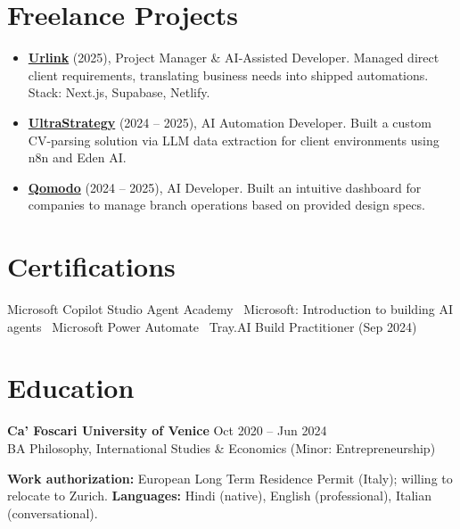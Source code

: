 \documentclass[a4paper,10pt]{article}
\begin{document}
\section{Freelance Projects}
\begin{itemize}
 \item \textbf{\href{https://smarturlink.com/}{Urlink}} (2025), Project Manager \& AI-Assisted Developer. Managed direct client requirements, translating business needs into shipped automations. Stack: Next.js, Supabase, Netlify.
 \item \textbf{\href{https://ultrastrategy.com}{UltraStrategy}} (2024 -- 2025), AI Automation Developer. Built a custom CV-parsing solution via LLM data extraction for client environments using n8n and Eden AI.
 \item \textbf{\href{https://www.qomodo.me/}{Qomodo}} (2024 -- 2025), AI Developer. Built an intuitive dashboard for companies to manage branch operations based on provided design specs.
\end{itemize}

\section{Certifications}
Microsoft Copilot Studio Agent Academy \textbullet\ Microsoft: Introduction to building AI agents \textbullet\ Microsoft Power Automate \textbullet\ Tray.AI Build Practitioner (Sep 2024)

\section{Education}
\textbf{Ca' Foscari University of Venice} \hfill Oct 2020 -- Jun 2024\\
BA Philosophy, International Studies \& Economics (Minor: Entrepreneurship)

\vspace{2pt}
{\small \textbf{Work authorization:} European Long Term Residence Permit (Italy); willing to relocate to Zurich. \quad \textbf{Languages:} Hindi (native), English (professional), Italian (conversational).}
\end{document}
